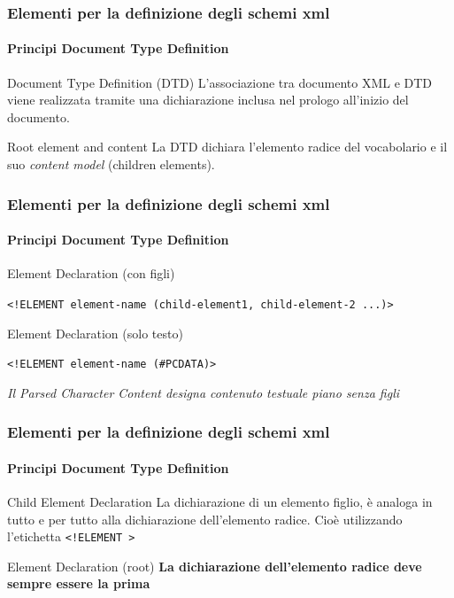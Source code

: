 \begin{frame}
    \frametitle{Elementi per la definizione degli schemi xml}
    \framesubtitle{Principi Document Type Definition}
    \addtocounter{nframe}{1}

    \begin{block}{Document Type Definition (DTD)}
         L'associazione tra documento XML e DTD viene realizzata tramite una dichiarazione inclusa nel prologo all'inizio del documento.
    \end{block}

    \begin{block}{Root element and content}
        La DTD dichiara l'elemento radice del vocabolario e il suo \textit{content model} (children elements).
    \end{block}
   
\end{frame}

\begin{frame}
    \frametitle{Elementi per la definizione degli schemi xml}
    \framesubtitle{Principi Document Type Definition}
    \addtocounter{nframe}{1}

    \begin{block}{Element Declaration (con figli)}
        \begin{center}\texttt{<!ELEMENT element-name (child-element1, child-element-2 ...)>}\end{center}
    \end{block}

    \begin{block}{Element Declaration (solo testo)}
    \begin{center}\texttt{<!ELEMENT element-name (\#PCDATA)>}\end{center}
    \end{block}
    \textit{Il Parsed Character Content designa contenuto testuale piano senza figli}
\end{frame}

\begin{frame}
    \frametitle{Elementi per la definizione degli schemi xml}
    \framesubtitle{Principi Document Type Definition}
    \addtocounter{nframe}{1}

    \begin{block}{Child Element Declaration}
        La dichiarazione di un elemento figlio, è analoga in tutto e per tutto alla dichiarazione dell'elemento radice. Cioè utilizzando l'etichetta \texttt{<!ELEMENT >}
    \end{block}

    \begin{block}{Element Declaration (root)}
     \textbf{La dichiarazione dell'elemento radice deve sempre essere la prima}
    \end{block}
\end{frame}

